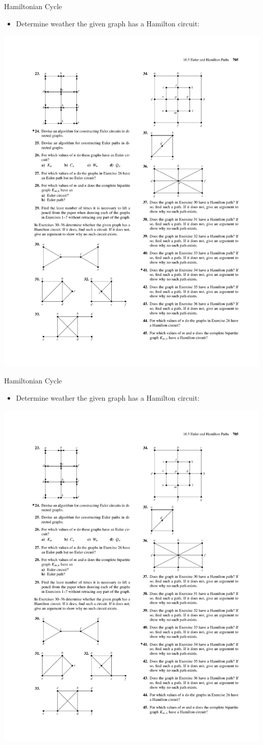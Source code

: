 \documentclass{beamer}
\theoremstyle{definition}
\begin{document}
\begin{frame}{Hamiltonian Cycle}
   \begin{itemize}
        \item Determine weather the given graph has a Hamilton circuit:
    \end{itemize}
    \centering \includegraphics[trim={3.1cm 5cm 15.4cm 20cm},clip,width=.5\linewidth]{p705}
\end{frame}

\begin{frame}{Hamiltonian Cycle}
   \begin{itemize}
        \item Determine weather the given graph has a Hamilton circuit:
    \end{itemize}
    \centering \includegraphics[trim={3.1cm 2cm 14cm 23cm},clip,width=.65\linewidth]{p705}
\end{frame}
\end{document}

